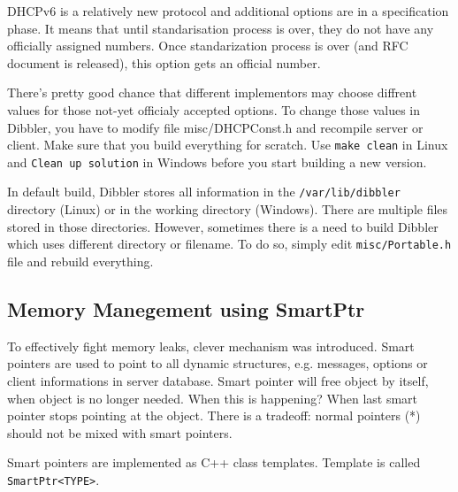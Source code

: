 DHCPv6 is a relatively new protocol and additional options are in a
specification phase. It means that until standarisation process is
over, they do not have any officially assigned numbers. Once
standarization process is over (and RFC document is released), this
option gets an official number. 

There's pretty good chance that different implementors may choose
diffrent values for those not-yet officialy accepted options. To
change those values in Dibbler, you have to modify file
misc/DHCPConst.h and recompile server or client. Make sure that you
build everything for scratch. Use \verb+make clean+ in Linux and
\verb+Clean up solution+ in Windows before you start building a new
version.

In default build, Dibbler stores all information in the
\verb+/var/lib/dibbler+ directory (Linux) or in the working directory
(Windows). There are multiple files stored in those
directories. However, sometimes there is a need to build Dibbler which uses
different directory or filename. To do so, simply edit
\verb+misc/Portable.h+ file and rebuild everything.

\subsection{Memory Manegement using SmartPtr}
To effectively fight memory leaks, clever mechanism was
introduced. Smart pointers are used to point to all dynamic
structures, e.g. messages, options or client informations in server
database. Smart pointer will free object by itself, when object is no
longer needed. When this is happening? When last smart pointer stops
pointing at the object. There is a tradeoff: normal pointers (*)
should not be mixed with smart pointers. 

Smart pointers are implemented as C++ class templates. Template is
called \verb+SmartPtr<TYPE>+.

